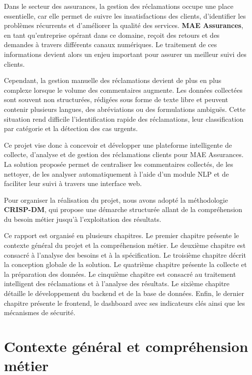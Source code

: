 \documentclass[12pt,a4paper,oneside]{report}
\begin{document}
Dans le secteur des assurances, la gestion des réclamations occupe une place essentielle, car elle permet de suivre les insatisfactions des clients, d’identifier les problèmes récurrents et d’améliorer la qualité des services. \textbf{MAE Assurances}, en tant qu’entreprise opérant dans ce domaine, reçoit des retours et des demandes à travers différents canaux numériques. Le traitement de ces informations devient alors un enjeu important pour assurer un meilleur suivi des clients.

Cependant, la gestion manuelle des réclamations devient de plus en plus complexe lorsque le volume des commentaires augmente. Les données collectées sont souvent non structurées, rédigées sous forme de texte libre et peuvent contenir plusieurs langues, des abréviations ou des formulations ambiguës. Cette situation rend difficile l’identification rapide des réclamations, leur classification par catégorie et la détection des cas urgents.

Ce projet vise donc à concevoir et développer une plateforme intelligente de collecte, d’analyse et de gestion des réclamations clients pour MAE Assurances. La solution proposée permet de centraliser les commentaires collectés, de les nettoyer, de les analyser automatiquement à l’aide d’un module NLP et de faciliter leur suivi à travers une interface web.

Pour organiser la réalisation du projet, nous avons adopté la méthodologie \textbf{CRISP-DM}, qui propose une démarche structurée allant de la compréhension du besoin métier jusqu’à l’exploitation des résultats.

Ce rapport est organisé en plusieurs chapitres. Le premier chapitre présente le contexte général du projet et la compréhension métier. Le deuxième chapitre est consacré à l’analyse des besoins et à la spécification. Le troisième chapitre décrit la conception globale de la solution. Le quatrième chapitre présente la collecte et la préparation des données. Le cinquième chapitre est consacré au traitement intelligent des réclamations et à l’analyse des résultats. Le sixième chapitre détaille le développement du backend et de la base de données. Enfin, le dernier chapitre présente le frontend, le dashboard avec ses indicateurs clés ainsi que les mécanismes de sécurité.


\chapter{Contexte général et compréhension métier}
\end{document}
